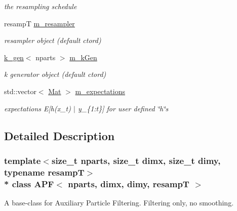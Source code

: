 \begin{DoxyCompactItemize}
\begin{DoxyCompactList}\small\item\em the resampling schedule \end{DoxyCompactList}\item 
resampT \hyperlink{classAPF_a28240f2cee9166dd043065947c6b8091}{m\+\_\+resampler}\hypertarget{classAPF_a28240f2cee9166dd043065947c6b8091}{}\label{classAPF_a28240f2cee9166dd043065947c6b8091}

\begin{DoxyCompactList}\small\item\em resampler object (default ctor\textquotesingle{}d) \end{DoxyCompactList}\item 
\hyperlink{classk__gen}{k\+\_\+gen}$<$ nparts $>$ \hyperlink{classAPF_acef5e67e9648d3b0d51b54f86d4c78e4}{m\+\_\+k\+Gen}\hypertarget{classAPF_acef5e67e9648d3b0d51b54f86d4c78e4}{}\label{classAPF_acef5e67e9648d3b0d51b54f86d4c78e4}

\begin{DoxyCompactList}\small\item\em k generator object (default ctor\textquotesingle{}d) \end{DoxyCompactList}\item 
std\+::vector$<$ \hyperlink{classAPF_a8e867c46870835e2103aee00f13f0be7}{Mat} $>$ \hyperlink{classAPF_a54c085c93b9398da910ff58a714d24de}{m\+\_\+expectations}\hypertarget{classAPF_a54c085c93b9398da910ff58a714d24de}{}\label{classAPF_a54c085c93b9398da910ff58a714d24de}

\begin{DoxyCompactList}\small\item\em expectations E\mbox{[}h(x\+\_\+t) $\vert$ y\+\_\+\{1\+:t\}\mbox{]} for user defined \char`\"{}h\char`\"{}s \end{DoxyCompactList}\end{DoxyCompactItemize}


\subsection{Detailed Description}
\subsubsection*{template$<$size\+\_\+t nparts, size\+\_\+t dimx, size\+\_\+t dimy, typename resampT$>$\\*
class A\+P\+F$<$ nparts, dimx, dimy, resamp\+T $>$}

A base-\/class for Auxiliary Particle Filtering. Filtering only, no smoothing. 

